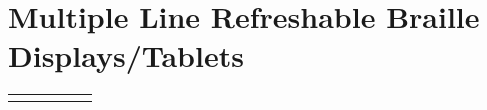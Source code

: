 \documentclass[14pt, letterpaper,twoside]{extreport}
\begin{document}
\pagebreak \hypertarget{multiple-line-refreshable-braille-displaystablets}{%
    \section*{Multiple Line Refreshable Braille Displays/Tablets}\label{multiple-line-refreshable-braille-displaystablets}}


\begin{longtable}[]{@{}
    >{\raggedright\arraybackslash}p{}
    >{\raggedright\arraybackslash}p{}
    >{\raggedright\arraybackslash}p{}
    >{\raggedright\arraybackslash}p{}
    >{\raggedright\arraybackslash}p{}
    >{\raggedright\arraybackslash}p{}@{}
    }
    \toprule\noalign{}
    

\end{longtable}
\end{document}
